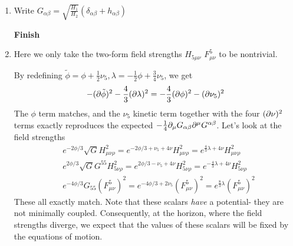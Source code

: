 \documentclass[11pt, class=article, crop=false]{standalone}
\begin{document}
\begin{enumerate}
	Each of the field strengths will obey:
	\[
		\begin{aligned}
			\dd\star [e^{-4 \phi/3} G_{\alpha \beta} \, F^{\alpha}_{\mu \nu} ]&= 0\\
			\dd\star [e^{2 \phi/3} \sqrt{G} G^{\alpha \beta}\,  H_{\alpha\, \mu \nu} ]&= 0\\
			\dd\star [e^{-2 \phi/3} \sqrt{G}\,  H_{\mu \nu \rho} ]&= 0\\
			\nabla^{\mu} [G^{\alpha \beta} G^{\gamma \delta} e^{2 \phi} \sqrt{G} \d_\mu C_{\beta \delta}] &= 0
		\end{aligned}
	\]
	The dilaton will obey:
	\[
		\frac83 \Box \, \phi - \frac12 e^{2\phi} \sqrt G \, G^{\alpha \beta} G^{\gamma \delta} \d C_{\alpha \gamma} \d C_{\beta \delta} + \frac{4}{3}  e^{-4 \phi/3} G_{\alpha \beta} F^{\alpha}_{\mu \nu} F^{\beta\, \mu \nu} - \frac{1}{6} e^{2\phi/3} \sqrt{G} G^{\alpha \beta} H_{\mu \nu \alpha} H^{\mu \nu \beta} + \frac{1}{18} e^{-2\phi/3} \sqrt{G} H_{\mu \nu \rho} H^{\mu \nu \rho}
	\]
	Finally, the metric will obey:
	\[
		R_{\mu \nu} - \frac12 g_{\mu \nu} R - \frac43 \d_\mu \phi \d_\nu \phi - \frac14  G^{\alpha \beta} G^{\gamma \delta}( \d_\mu G_{\alpha \gamma} \d_\nu G_{\beta \delta} + e^{2 \phi} \sqrt{G} \d)
	\]
	
	The solution in question has nonzero (magnetic) $H_{\mu \nu \rho}$ and (electric) $H_{\mu \nu}$, which are functions of $r$ alone.
	\textbf{Finish}
	
	\textbf{show solution}
	
	\item Write $G_{\alpha \beta} = \sqrt{\frac{H_1}{H_2}} (\delta_{\alpha \beta} + h_{\alpha \beta})$
	
	\textbf{Finish}
	
	\item 
	Here we only take the two-form field strengths $H_{5 \mu \nu}$ $F^5_{\mu \nu}$ to be nontrivial. 
	
	By redefining $\tilde \phi = \phi+\frac12 \nu_5, \lambda = -\frac12 \phi + \frac34 \nu_5$, we get
	\[
		- (\partial \tilde \phi)^2 - \frac43 (\partial \lambda)^2 = - \frac43 (\partial \phi)^2 - (\partial \nu_5)^2
	\]
	The $\phi$ term matches, and the $\nu_5$ kinetic term together with the four $(\partial \nu)^2$ terms exactly reproduces the expected $-\frac14 \partial_\mu G_{\alpha \beta} \partial^\mu G^{\alpha \beta }$. Let's look at the field strengths
	\[
	\begin{aligned}
		&e^{-2\phi/3} \sqrt G H_{\mu \nu \rho}^2 = e^{-2\phi/3 + \nu_5 + 4 \nu} H_{\mu \nu \rho}^2 = e^{\frac43 \lambda + 4 \nu}  H_{\mu \nu \rho}^2\\
		& e^{2\phi/3} \sqrt G  G^{55} H_{5 \nu \rho}^2 = e^{2\phi/3 - \nu_5 + 4 \nu} H_{5 \nu \rho}^2 = e^{-\frac43 \lambda + 4 \nu} H_{5 \nu \rho}^2\\
		& e^{-4 \phi/3} G_{55} (F^5_{\mu \nu})^2 = e^{-4\phi/3 + 2 \nu_5}  (F^5_{\mu \nu})^2 = e^{\frac83 \lambda} (F^5_{\mu \nu})^2
	\end{aligned}
	\]
	These all exactly match. Note that these scalars \emph{have} a potential- they are not minimally coupled. Consequently, at the horizon, where the field strengths diverge, we expect that the values of these scalars will be fixed by the equations of motion. 
	

\end{enumerate}
\end{document}
